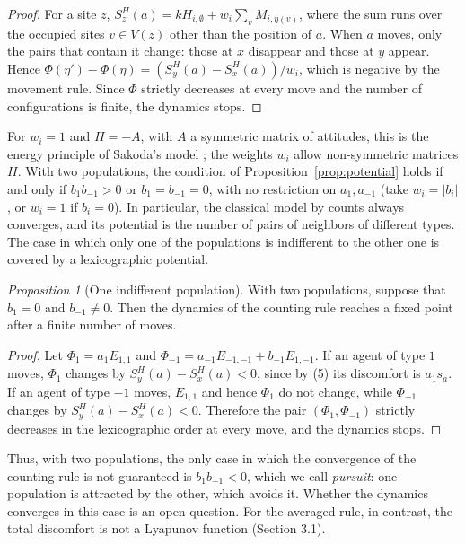 \documentclass{article}
\theoremstyle{remark}
\newtheorem{proposition}{Proposition}
\begin{document}
\begin{proof}
For a site $z$, $S_z^H(a)=kH_{i,\emptyset}+w_i\sum_{v}M_{i,\eta(v)}$, where the sum runs over the occupied sites $v\in V(z)$ other than the position of $a$. When $a$ moves, only the pairs that contain it change: those at $x$ disappear and those at $y$ appear. Hence $\Phi(\eta')-\Phi(\eta)=(S_y^H(a)-S_x^H(a))/w_i$, which is negative by the movement rule. Since $\Phi$ strictly decreases at every move and the number of configurations is finite, the dynamics stops.
\end{proof}

For $w_i=1$ and $H=-A$, with $A$ a symmetric matrix of attitudes, this is the energy principle of Sakoda's model \cite{medina2017self,goles2020migration}; the weights $w_i$ allow non-symmetric matrices $H$. With two populations, the condition of Proposition~\ref{prop:potential} holds if and only if $b_1 b_{-1}>0$ or $b_1=b_{-1}=0$, with no restriction on $a_1,a_{-1}$ (take $w_i=|b_i|$, or $w_i=1$ if $b_i=0$). In particular, the classical model by counts always converges, and its potential is the number of pairs of neighbors of different types. The case in which only one of the populations is indifferent to the other one is covered by a lexicographic potential.

\begin{proposition}[One indifferent population]\label{prop:lexicographic}
With two populations, suppose that $b_1=0$ and $b_{-1}\neq 0$. Then the dynamics of the counting rule reaches a fixed point after a finite number of moves.
\end{proposition}

\begin{proof}
Let $\Phi_1=a_1E_{1,1}$ and $\Phi_{-1}=a_{-1}E_{-1,-1}+b_{-1}E_{1,-1}$. If an agent of type $1$ moves, $\Phi_1$ changes by $S_y^H(a)-S_x^H(a)<0$, since by (5) its discomfort is $a_1 s_a$. If an agent of type $-1$ moves, $E_{1,1}$ and hence $\Phi_1$ do not change, while $\Phi_{-1}$ changes by $S_y^H(a)-S_x^H(a)<0$. Therefore the pair $(\Phi_1,\Phi_{-1})$ strictly decreases in the lexicographic order at every move, and the dynamics stops.
\end{proof}

Thus, with two populations, the only case in which the convergence of the counting rule is not guaranteed is $b_1 b_{-1}<0$, which we call \emph{pursuit}: one population is attracted by the other, which avoids it. Whether the dynamics converges in this case is an open question. For the averaged rule, in contrast, the total discomfort is not a Lyapunov function (Section 3.1).
\end{document}
